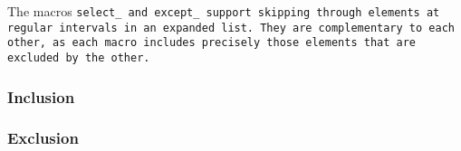 \def\Subsubsection#1{\subsubsection{#1}}

The macros \tt{select_} and \tt{except_} support skipping
through elements at regular intervals in an expanded list.
They are complementary to each other, as each macro includes
precisely those elements that are excluded by the other.

\Subsubsection{Inclusion}

\Subsubsection{Exclusion}
